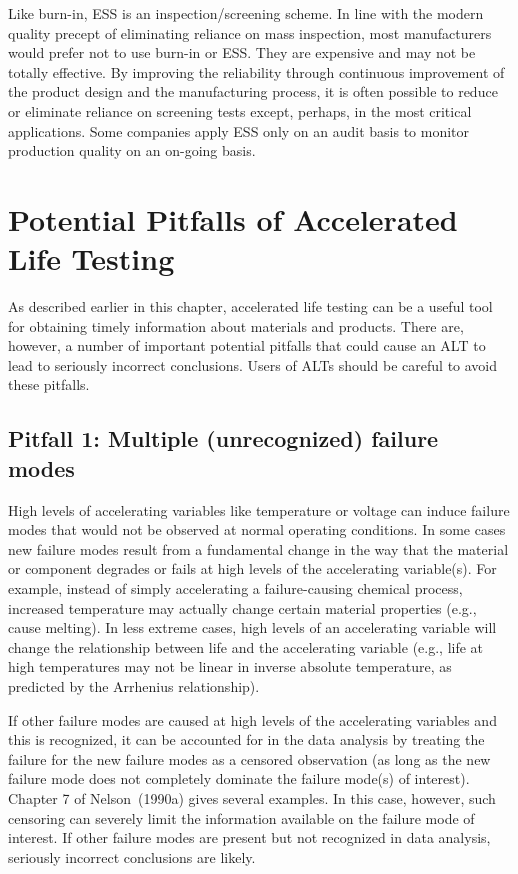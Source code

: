 Like burn-in, ESS is an inspection/screening scheme.  In line with the
modern quality precept of eliminating reliance on mass inspection,
most manufacturers would prefer not to use burn-in or ESS. They are
expensive and may not be totally effective.  By improving the
reliability through continuous improvement of the product design and
the manufacturing process, it is often possible to reduce or eliminate
reliance on screening tests except, perhaps, in the most critical
applications. Some companies apply
ESS only on an audit basis to monitor production quality on an
on-going basis. 


\section{Potential Pitfalls of Accelerated Life Testing}
\label{section:alp.pitfalls}
As described earlier in this chapter, accelerated life testing can
be a useful tool for obtaining timely information about materials
and products.  There are, however, a number of important potential
pitfalls that could cause an ALT to lead to seriously incorrect
conclusions. Users of ALTs should be careful to avoid these pitfalls.

\subsection{Pitfall 1: Multiple (unrecognized) failure modes}

High levels of accelerating variables like temperature or voltage
can induce failure modes that would not be observed at normal
operating conditions.  In some cases new failure modes result from a
fundamental change in the way that the material or component
degrades or fails at high levels of the accelerating variable(s).
For example, instead of simply accelerating a failure-causing
chemical process, increased temperature may actually change certain
material properties (e.g., cause melting).  In less extreme cases,
high levels of an accelerating variable will change the relationship
between life and the accelerating variable (e.g., life at high
temperatures may not be linear in inverse absolute temperature, as
predicted by the Arrhenius relationship).

If other failure modes are caused at high levels of the accelerating
variables and this is recognized, it can be accounted for in the
data analysis by treating the failure for the new failure modes as a
censored observation (as long as the new failure mode does not
completely dominate the failure mode(s) of interest). Chapter 7 of
Nelson~(1990a) gives several examples. In this case, however, such
censoring can severely limit the information available on the
failure mode of interest.  If other failure modes are present but
not recognized in data analysis, seriously incorrect conclusions are
likely.

